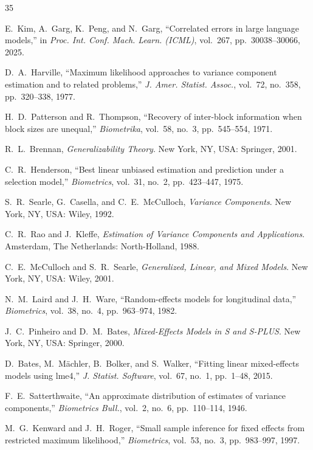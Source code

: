 \documentclass{ieeeaccess}
\theoremstyle{definition}
\theoremstyle{plain}
\begin{document}
\begin{thebibliography}{35}

 E.~Kim, A.~Garg, K.~Peng, and N.~Garg, ``Correlated errors in
large language models,'' in \emph{Proc. Int. Conf. Mach. Learn. (ICML)},
vol.~267, pp.~30038--30066, 2025.

 D.~A.~Harville, ``Maximum likelihood approaches to variance
component estimation and to related problems,'' \emph{J. Amer. Statist. Assoc.},
vol.~72, no.~358, pp.~320--338, 1977.

 H.~D.~Patterson and R.~Thompson, ``Recovery of
inter-block information when block sizes are unequal,'' \emph{Biometrika},
vol.~58, no.~3, pp.~545--554, 1971.

 R.~L.~Brennan, \emph{Generalizability Theory}. New York, NY,
USA: Springer, 2001.

 C.~R.~Henderson, ``Best linear unbiased estimation and
prediction under a selection model,'' \emph{Biometrics}, vol.~31, no.~2,
pp.~423--447, 1975.

 S.~R.~Searle, G.~Casella, and C.~E.~McCulloch,
\emph{Variance Components}. New York, NY, USA: Wiley, 1992.

 C.~R.~Rao and J.~Kleffe, \emph{Estimation of Variance
Components and Applications}. Amsterdam, The Netherlands: North-Holland, 1988.

 C.~E.~McCulloch and S.~R.~Searle, \emph{Generalized,
Linear, and Mixed Models}. New York, NY, USA: Wiley, 2001.

 N.~M.~Laird and J.~H.~Ware, ``Random-effects models for
longitudinal data,'' \emph{Biometrics}, vol.~38, no.~4, pp.~963--974, 1982.

 J.~C.~Pinheiro and D.~M.~Bates, \emph{Mixed-Effects
Models in S and S-PLUS}. New York, NY, USA: Springer, 2000.

 D.~Bates, M.~M\"{a}chler, B.~Bolker, and S.~Walker,
``Fitting linear mixed-effects models using lme4,'' \emph{J. Statist.
Software}, vol.~67, no.~1, pp.~1--48, 2015.

 F.~E.~Satterthwaite, ``An approximate distribution
of estimates of variance components,'' \emph{Biometrics Bull.}, vol.~2, no.~6,
pp.~110--114, 1946.

 M.~G.~Kenward and J.~H.~Roger, ``Small sample inference
for fixed effects from restricted maximum likelihood,'' \emph{Biometrics},
vol.~53, no.~3, pp.~983--997, 1997.


\end{thebibliography}
\end{document}
